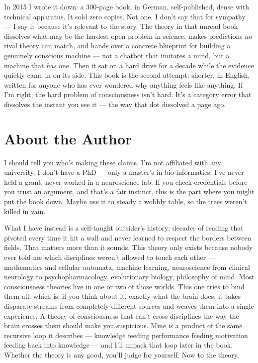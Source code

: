 \documentclass[11pt, twoside, openright]{book}
\begin{document}
In 2015 I wrote it down: a 300-page book, in German, self-published, dense with technical apparatus. It sold zero copies. Not one. I don't say that for sympathy --- I say it because it's relevant to the story. The theory in that unread book dissolves what may be the hardest open problem in science, makes predictions no rival theory can match, and hands over a concrete blueprint for building a genuinely conscious machine --- not a chatbot that imitates a mind, but a machine that \textit{has} one. Then it sat on a hard drive for a decade while the evidence quietly came in on its side. This book is the second attempt: shorter, in English, written for anyone who has ever wondered why anything feels like anything. If I'm right, the hard problem of consciousness isn't hard. It's a category error that dissolves the instant you see it --- the way that dot dissolved a page ago.


\chapter*{About the Author}

I should tell you who's making these claims. I'm not affiliated with any university. I don't have a PhD --- only a master's in bio-informatics. I've never held a grant, never worked in a neuroscience lab. If you check credentials before you trust an argument, and that's a fair instinct, this is the part where you might put the book down. Maybe use it to steady a wobbly table, so the trees weren't killed in vain.

What I have instead is a self-taught outsider's history: decades of reading that pivoted every time it hit a wall and never learned to respect the borders between fields. That matters more than it sounds. This theory only exists because nobody ever told me which disciplines weren't allowed to touch each other --- mathematics and cellular automata, machine learning, neuroscience from clinical neurology to psychopharmacology, evolutionary biology, philosophy of mind. Most consciousness theories live in one or two of those worlds. This one tries to bind them all, which is, if you think about it, exactly what the brain does: it takes disparate streams from completely different sources and weaves them into a single experience. A theory of consciousness that can't cross disciplines the way the brain crosses them should make you suspicious. Mine is a product of the same recursive loop it describes --- knowledge feeding performance feeding motivation feeding back into knowledge --- and I'll unpack that loop later in the book. Whether the theory is any good, you'll judge for yourself. Now to the theory.
\end{document}
